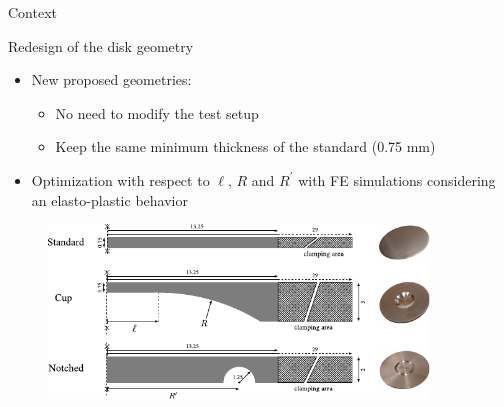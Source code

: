 \documentclass[9pt]{beamer}
\begin{document}
\begin{frame}{Context}
    
	
\end{frame}


\begin{frame}{Redesign of the disk geometry}

\begin{itemize}
	\item New proposed geometries:
	\vspace{0.15cm}
	\begin{itemize}
		\item No need to modify the test setup
		\vspace{0.15cm}
		\item Keep the same minimum thickness of the standard (0.75 mm)
		\vspace{0.15cm}
	\end{itemize}
	\item Optimization with respect to $\ell$, $R$ and $R^\prime$ with FE simulations considering an elasto-plastic behavior
\end{itemize}

\begin{figure}
	\centering
	\includegraphics[width=0.9\textwidth]{Images/disks.pdf}
\end{figure}

\end{frame}
\end{document}
